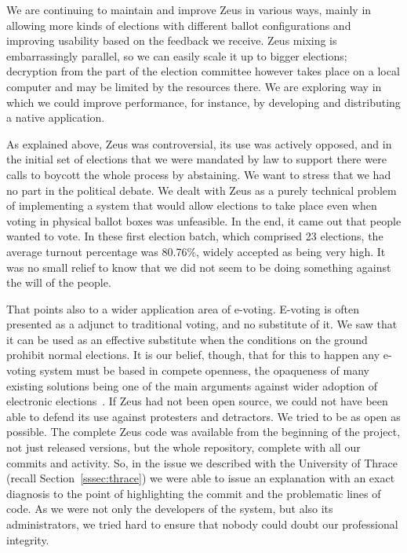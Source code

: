 \documentclass[jets]{usenixjournal}
\begin{document}
We are continuing to maintain and improve Zeus in various ways, mainly
in allowing more kinds of elections with different ballot
configurations and improving usability based on the feedback we
receive. Zeus mixing is embarrassingly parallel, so we can easily scale
it up to bigger elections; decryption from the part of the election
committee however takes place on a local computer and may be limited
by the resources there. We are exploring way in which we could improve
performance, for instance, by developing and distributing a native
application.

As explained above, Zeus was controversial, its use was actively
opposed, and in the initial set of elections that we were mandated by
law to support there were calls to boycott the whole process by
abstaining. We want to stress that we had no part in the political
debate. We dealt with Zeus as a purely technical problem of
implementing a system that would allow elections to take place even
when voting in physical ballot boxes was unfeasible. In the end, it
came out that people wanted to vote. In these first election batch,
which comprised 23 elections, the average turnout percentage was
80.76\%, widely accepted as being very high. It was no small relief to
know that we did not seem to be doing something against the will of
the people.

That points also to a wider application area of e-voting. E-voting is
often presented as a adjunct to traditional voting, and no substitute
of it. We saw that it can be used as an effective substitute when the
conditions on the ground prohibit normal elections. It is our belief,
though, that for this to happen any e-voting system must be based in
compete openness, the opaqueness of many existing solutions being one
of the main arguments against wider adoption of electronic
elections~\cite{simons:2012,jones:2012}. If Zeus had not been open
source, we could not have been able to defend its use against
protesters and detractors. We tried to be as open as
possible. The complete Zeus code was available from the beginning of
the project, not just released versions, but the whole repository,
complete with all our commits and activity. So, in the issue we
described with the University of Thrace (recall
Section~\ref{sssec:thrace}) we were able to issue an explanation with
an exact diagnosis to the point of highlighting the commit and the
problematic lines of code. As we were not only the developers of the
system, but also its administrators, we tried hard to ensure that
nobody could doubt our professional integrity.
\end{document}
